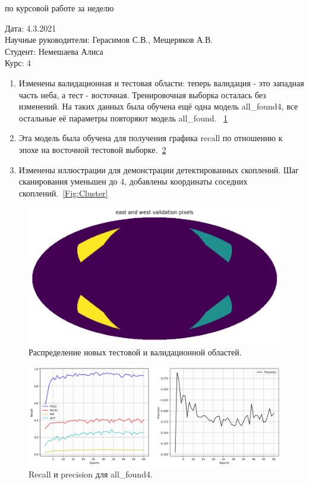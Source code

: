 \documentclass{article}
\begin{document}
\begin{center}{ по курсовой работе за неделю\\}\end{center}
Дата: 4.3.2021\\
Научные руководители: Герасимов С.В., Мещеряков А.В.\\
Студент: Немешаева Алиса\\
Курс: 4\\

\renewcommand{\labelitemi}{$\blacksquare$}
\renewcommand\labelitemii{$\square$}
\begin{enumerate}
    \item Изменены валидационная и тестовая области: теперь валидация - это западная часть неба, 
        а тест - восточная. Тренировочная выборка осталась без изменений. На таких данных была 
        обучена ещё одна модель all\_found4, все остальные её параметры повторяют модель all\_found.
        ~\ref{Fig:Val}\\
    \item Эта модель была обучена для получения графика recall по отношению к эпохе на восточной 
        тестовой выборке.~\ref{Fig:Recall}\\
    \item Изменены иллюстрации для демонстрации детектированных скоплений. Шаг сканирования 
        уменьшен до 4, добавлены координаты соседних скоплений.~\ref{Fig:Cluster}\\
\end{enumerate}




\begin{figure}[h]
\includegraphics[width=0.6\linewidth]{val}
\caption{Распределение новых тестовой и валидационной областей.}
\label{Fig:Val}
\end{figure}

\begin{figure}[h]
\includegraphics[width=0.8\linewidth]{recall}
\caption{Recall и precision для all\_found4.}
\label{Fig:Recall}
\end{figure}
\end{document}
